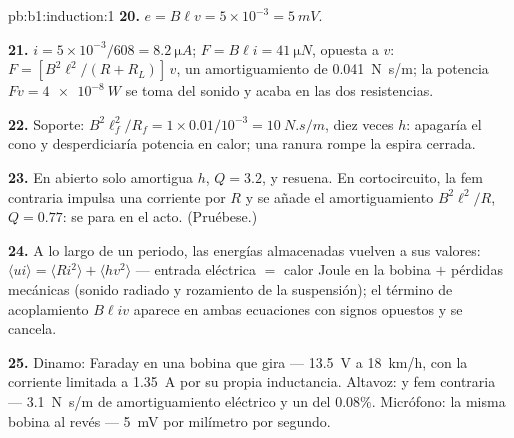 \begin{solution}{pb:b1:induction:1}
\textbf{20.} $e = B\ell v = 5 \times 10^{-3} = \qty{5}{mV}$.

\textbf{21.} $i = 5 \times 10^{-3}/608 = \qty{8.2}{\micro A}$; $F = B\ell i = \qty{41}{\micro N}$,
opuesta a $v$: $F = [B^2\ell^2/(R + R_L)]\,v$, un amortiguamiento de \qty{0.041}{N.s/m};
la potencia $Fv = \qty{4e-8}{W}$ se toma del sonido y acaba en las
dos resistencias.

\textbf{22.} Soporte: $B^2\ell_f^2/R_f = 1 \times 0.01/10^{-3} = \qty{10}{N.s/m}$, diez
veces $h$: apagaría el cono y desperdiciaría potencia en calor; una
ranura rompe la espira cerrada.

\textbf{23.} En abierto solo amortigua $h$, $Q = 3.2$, y resuena. En
cortocircuito, la fem contraria impulsa una corriente por $R$ y se añade
el amortiguamiento $B^2\ell^2/R$, $Q = 0.77$: se para en el acto. (Pruébese.)

\textbf{24.} A lo largo de un periodo, las energías almacenadas vuelven a
sus valores: $\langle ui\rangle = \langle Ri^2\rangle + \langle hv^2\rangle$ --- entrada eléctrica $=$
calor Joule en la bobina $+$ pérdidas mecánicas (sonido radiado y
rozamiento de la suspensión); el término de acoplamiento $B\ell iv$
aparece en ambas ecuaciones con signos opuestos y se cancela.

\textbf{25.} Dinamo: Faraday en una bobina que gira --- \qty{13.5}{V} a
\qty{18}{km/h}, con la corriente limitada a \qty{1.35}{A} por su propia
inductancia. Altavoz:  y fem contraria --- \qty{3.1}{N.s/m} de
amortiguamiento eléctrico y un  del $0.08\%$. Micrófono: la misma bobina al revés ---
\qty{5}{mV} por milímetro por segundo.
\end{solution}
